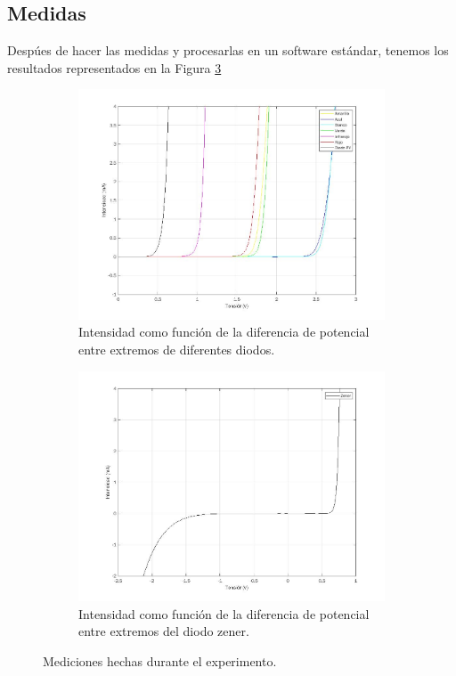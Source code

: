 \documentclass[a4paper,12pt]{article}
\begin{document}
\subsection{Medidas}
Despúes de hacer las medidas y procesarlas en un software estándar, tenemos los resultados representados en la Figura \ref{3}
\begin{figure}[H]
	\begin{subfigure}{0.49\textwidth}
		\label{Diodos}
		\includegraphics[width=.9\textwidth]{diodos.jpg}
		\centering
		\caption{Intensidad como función de la diferencia de potencial entre extremos de diferentes diodos.}	
	\end{subfigure}
\begin{subfigure}{0.49\textwidth}
	\centering
	\label{zener}
	\includegraphics[width=.9\textwidth]{zener.jpg}
	\caption{Intensidad como función de la diferencia de potencial entre extremos del diodo zener.}
\end{subfigure}
\caption{Mediciones hechas durante el experimento.}\label{3}
\end{figure}
\end{document}
